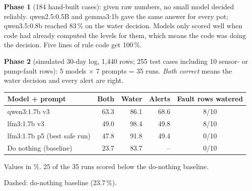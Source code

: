 \documentclass[10pt,a4paper]{article}
\begin{document}
\textbf{Phase 1} (184 hand-built cases): given raw numbers, no small model decided reliably.
qwen2.5:0.5B and gemma3:1b gave the same answer for every pot; qwen3.5:0.8b reached 83\,\% on the
water decision. Models only scored well when code had already computed the levels for them, which
means the code was doing the decision. Five lines of rule code get 100\,\%.

\textbf{Phase 2} (simulated 30-day log, 1,440 rows; 255 test cases including 10 sensor- or pump-fault rows):
5 models $\times$ 7 prompts = 35 runs. \emph{Both correct} means the water decision and every
alert are right.

\begin{minipage}[t]{0.56\textwidth}
\vspace{0pt}
\small
\begin{tabularx}{\linewidth}{@{}Xrrrc@{}}
\toprule
Model + prompt & Both & Water & Alerts & Fault rows watered \\
\midrule
qwen3:1.7b v3 & 63.3 & 86.1 & 68.6 & \color{warn}8/10 \\
lfm3:1.7b v3 & 49.0 & 98.4 & 49.8 & \color{warn}8/10 \\
lfm3:1.7b p5 (best safe run) & 47.8 & 91.8 & 49.4 & 0/10 \\
Do nothing (baseline) & 23.7 & 83.7 & -- & 0/10 \\
\bottomrule
\end{tabularx}\par
\footnotesize\color{muted} Values in \%. 25 of the 35 runs scored below the do-nothing baseline.
\end{minipage}\hfill
\begin{minipage}[t]{0.41\textwidth}
\vspace{0pt}
\centering
{}\par
\footnotesize\color{muted} Dashed: do-nothing baseline (23.7\,\%).
\end{minipage}
\end{document}
